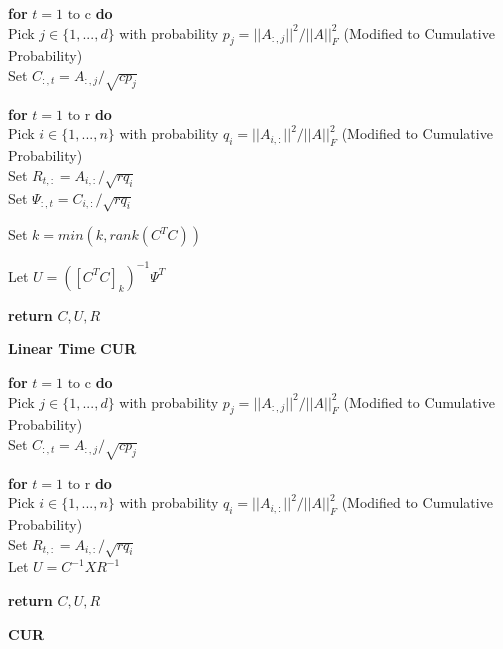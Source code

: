 \documentclass{article}
\begin{document}
\begin{algorithm}[H]
\textbf{for} $t = \text{1 to c} $ \textbf{do}\;\\
    Pick $j \in \{1,...,d\}$ with probability $ p_{j} = ||A_{:,j}||^2/||A||^2_{F}$  (Modified to Cumulative Probability)\;\\
    Set $C_{:,t} = A_{:,j}/\sqrt{cp_{j}}$ \;
    
\textbf{for} $t = \text{1 to r} $ \textbf{do}\;\\
    Pick $i \in \{1,...,n\}$ with probability $ q_{i} = ||A_{i,:}||^2/||A||^2_{F}$ (Modified to Cumulative Probability)\; \\
    Set $R_{t,:} = A_{i,:}/\sqrt{rq_{i}}$ \; \\
    Set $\Psi_{:,t} = C_{i,:}/\sqrt{rq_{i}}$ \;
    
Set $k = min(k,rank(C^TC))$ \; 

Let $U = ([C^TC]_{k})^{-1} \Psi^T $ \;

\textbf{return} $C,U,R$ 
\caption{{\bf Linear Time CUR} \label{Algorithm}}
\end{algorithm}

\begin{algorithm}[H]
\textbf{for} $t = \text{1 to c} $ \textbf{do}\;\\
    Pick $j \in \{1,...,d\}$ with probability $ p_{j} = ||A_{:,j}||^2/||A||^2_{F}$  (Modified to Cumulative Probability)\;\\
    Set $C_{:,t} = A_{:,j}/\sqrt{cp_{j}}$ \;
    
\textbf{for} $t = \text{1 to r} $ \textbf{do}\;\\
    Pick $i \in \{1,...,n\}$ with probability $ q_{i} = ||A_{i,:}||^2/||A||^2_{F}$ (Modified to Cumulative Probability)\; \\
    Set $R_{t,:} = A_{i,:}/\sqrt{rq_{i}}$ \; \\

Let $U = C^{-1} X R^{-1}  $ \;

\textbf{return} $C,U,R$ 
\caption{{\bf CUR} \label{Algorithm cur}}
\end{algorithm}
\end{document}
